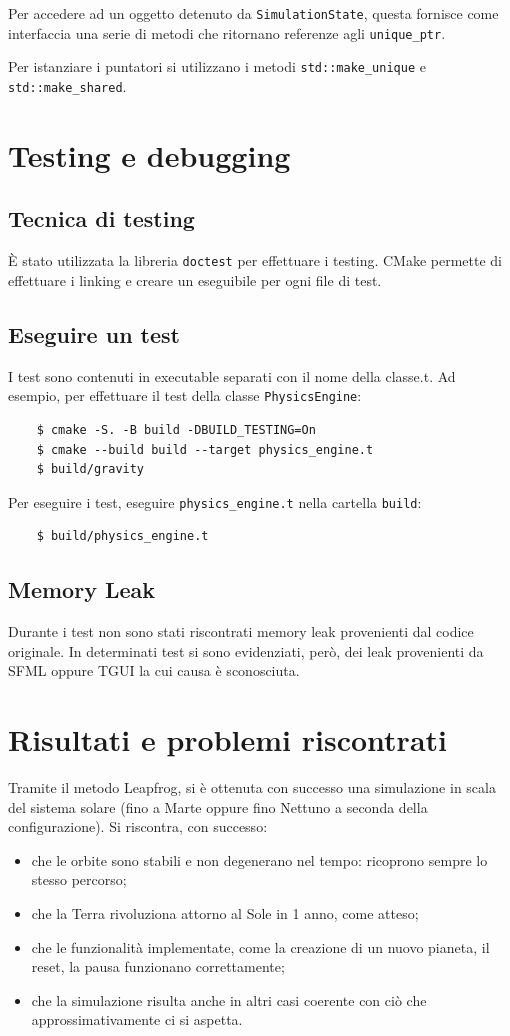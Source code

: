 \documentclass{article}
\begin{document}
Per accedere ad un oggetto detenuto da \verb|SimulationState|, questa fornisce come interfaccia una serie di metodi che ritornano referenze agli \verb|unique_ptr|.

Per istanziare i puntatori si utilizzano i metodi \verb|std::make_unique| e \verb|std::make_shared|.

\section{Testing e debugging}
\subsection{Tecnica di testing}
È stato utilizzata la libreria \verb|doctest| per effettuare i testing. CMake permette di effettuare i linking e creare un eseguibile per ogni file di test.

\subsection{Eseguire un test}
I test sono contenuti in executable separati con il nome della classe.t. Ad esempio, per effettuare il test della classe \verb|PhysicsEngine|:
\begin{verbatim}
    $ cmake -S. -B build -DBUILD_TESTING=On
    $ cmake --build build --target physics_engine.t
    $ build/gravity
\end{verbatim}

Per eseguire i test, eseguire \verb|physics_engine.t| nella cartella \verb|build|:
\begin{verbatim}
    $ build/physics_engine.t
\end{verbatim}
\subsection{Memory Leak}
Durante i test non sono stati riscontrati memory leak provenienti dal codice originale. In determinati test si sono evidenziati, però, dei leak provenienti da SFML oppure TGUI la cui causa è sconosciuta.

\section{Risultati e problemi riscontrati}
Tramite il metodo Leapfrog, si è ottenuta con successo una simulazione in scala del sistema solare (fino a Marte oppure fino Nettuno a seconda della configurazione). 
Si riscontra, con successo:
\begin{itemize}
    \item che le orbite sono stabili e non degenerano nel tempo: ricoprono sempre lo stesso percorso;
    \item che la Terra rivoluziona attorno al Sole in 1 anno, come atteso;
    \item che le funzionalità implementate, come la creazione di un nuovo pianeta, il reset, la pausa funzionano correttamente;
    \item che la simulazione risulta anche in altri casi coerente con ciò che approssimativamente ci si aspetta.
\end{itemize}
\end{document}
